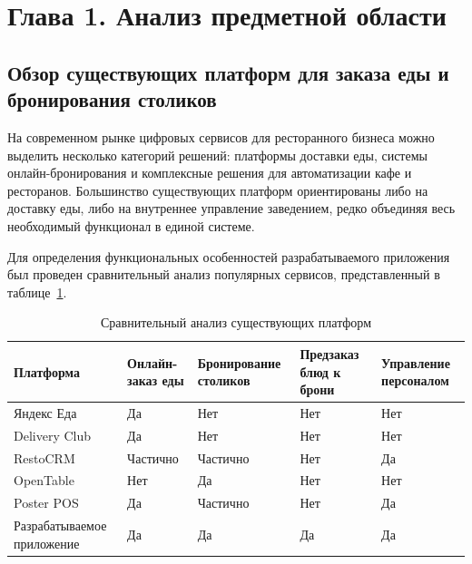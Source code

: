\section*{Глава 1. Анализ предметной области}

\subsection{Обзор существующих платформ для заказа еды и бронирования столиков}

На современном рынке цифровых сервисов для ресторанного бизнеса можно выделить несколько категорий решений: платформы доставки еды, системы онлайн-бронирования и комплексные решения для автоматизации кафе и ресторанов. Большинство существующих платформ ориентированы либо на доставку еды, либо на внутреннее управление заведением, редко объединяя весь необходимый функционал в единой системе.

Для определения функциональных особенностей разрабатываемого приложения был проведен сравнительный анализ популярных сервисов, представленный в таблице~\ref{tab:competitors}.

\begin{table}[ht!]
\centering
\caption{Сравнительный анализ существующих платформ}
\label{tab:competitors}
\begin{tabular}{|
>{\raggedright\arraybackslash}p{3.5cm}|
>{\centering\arraybackslash}p{2.4cm}|
>{\centering\arraybackslash}p{3.1cm}|
>{\centering\arraybackslash}p{3.1cm}|
>{\centering\arraybackslash}p{2.8cm}|}
\hline
\textbf{Платформа} &
\textbf{Онлайн-заказ еды} &
\textbf{Бронирование столиков} &
\textbf{Предзаказ блюд к брони} &
\textbf{Управление персоналом} \\ \hline

	Яндекс Еда &
	Да &
	Нет &
	Нет &
	Нет \\ \hline
	
	Delivery Club &
	Да &
	Нет &
	Нет &
	Нет \\ \hline
	
	RestoCRM &
	Частично &
	Частично &
	Нет &
	Да \\ \hline
	
	OpenTable &
	Нет &
	Да &
	Нет &
	Нет \\ \hline
	
	Poster POS &
	Да &
	Частично &
	Нет &
	Да \\ \hline
	
	Разрабатываемое приложение &
	Да &
	Да &
	Да &
	Да \\ \hline
\end{tabular}

\end{table}

